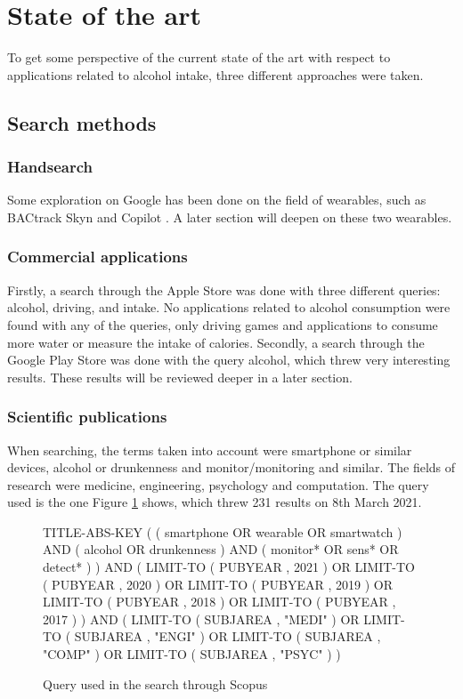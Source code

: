 \section{State of the art}
\label{state}

To get some perspective of the current state of the art with respect to applications related to alcohol intake, three different approaches were taken.

\subsection{Search methods}

\subsubsection{Handsearch}

Some exploration on Google has been done on the field of wearables, such as BACtrack Skyn \cite{bactrackskyn} and Copilot \cite{copiloto}. A later section will deepen on these two wearables.

\subsubsection{Commercial applications}

Firstly, a search through the Apple Store \cite{applestore} was done with three different queries: alcohol, driving, and intake. No applications related to alcohol consumption were found with any of the queries, only driving games and applications to consume more water or measure the intake of calories.
Secondly, a search through the Google Play Store \cite{googleplay} was done with the query alcohol, which threw very interesting results. These results will be reviewed deeper in a later section.

\subsubsection{Scientific publications}

When searching, the terms taken into account were smartphone or similar devices, alcohol or drunkenness and monitor/monitoring and similar. The fields of research were medicine, engineering, psychology and computation. The query used is the one Figure \ref{scopusquery} shows, which threw 231 results on 8th March 2021.

\begin{figure}[h!]
  TITLE-ABS-KEY ( ( smartphone  OR  wearable  OR  smartwatch )  AND  ( alcohol  OR  drunkenness )  AND  ( monitor*  OR  sens*  OR  detect* ) )  AND  ( LIMIT-TO ( PUBYEAR ,  2021 )  OR  LIMIT-TO ( PUBYEAR ,  2020 )  OR  LIMIT-TO ( PUBYEAR ,  2019 )  OR  LIMIT-TO ( PUBYEAR ,  2018 )  OR  LIMIT-TO ( PUBYEAR ,  2017 ) )  AND  ( LIMIT-TO ( SUBJAREA ,  "MEDI" )  OR  LIMIT-TO ( SUBJAREA ,  "ENGI" )  OR  LIMIT-TO ( SUBJAREA ,  "COMP" )  OR  LIMIT-TO ( SUBJAREA ,  "PSYC" ) )
  \caption{Query used in the search through Scopus \cite{scopus}}
  \label{scopusquery}
\end{figure}


